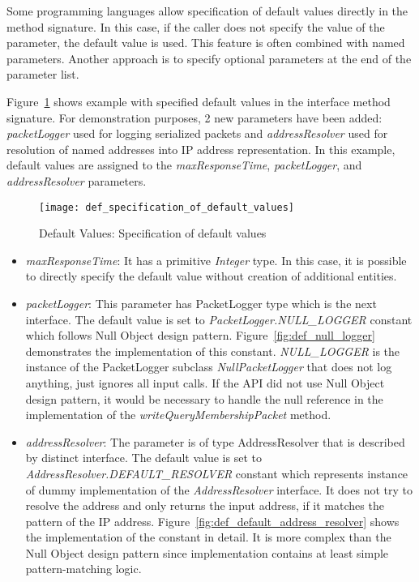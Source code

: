 Some programming languages allow specification of default values directly in the method signature.
In this case, if the caller does not specify the value of the parameter, the default value is used.
This feature is often combined with named parameters.
Another approach is to specify optional parameters at the end of the parameter list.

Figure~\ref{fig:def_specification_of_default_values} shows example with specified default values in the interface
method signature.
For demonstration purposes, 2 new parameters have been added: \textit{packetLogger} used for logging serialized
packets and \textit{addressResolver} used for resolution of named addresses into IP address representation.
In this example, default values are assigned to the \textit{maxResponseTime}, \textit{packetLogger},
and \textit{addressResolver} parameters.

\begin{figure}[!htb]
    \centering
    \texttt{[image: def\_specification\_of\_default\_values]}
    \caption{Default Values: Specification of default values}
    \label{fig:def_specification_of_default_values}
\end{figure}

\begin{itemize}
    \item \textit{maxResponseTime}: It has a primitive \textit{Integer} type.
    In this case, it is possible to directly specify the default value without creation of additional entities.
    \item \textit{packetLogger}: This parameter has PacketLogger type which is the next interface.
    The default value is set to \textit{PacketLogger.NULL\_LOGGER} constant which follows Null Object design pattern.
    Figure~\ref{fig:def_null_logger} demonstrates the implementation of this constant.
    \textit{NULL\_LOGGER} is the instance of the PacketLogger subclass \textit{NullPacketLogger} that does
    not log anything, just ignores all input calls.
    If the API did not use Null Object design pattern, it would be necessary to handle the null reference in the
    implementation of the \textit{writeQueryMembershipPacket} method.
    \item \textit{addressResolver}: The parameter is of type AddressResolver that is described by distinct interface.
    The default value is set to \textit{AddressResolver.DEFAULT\_RESOLVER} constant which represents instance of dummy
    implementation of the \textit{AddressResolver} interface.
    It does not try to resolve the address and only returns the input address,
    if it matches the pattern of the IP address.
    Figure~\ref{fig:def_default_address_resolver} shows the implementation of the constant in detail.
    It is more complex than the Null Object design pattern since implementation contains at least
    simple pattern-matching logic.
\end{itemize}

